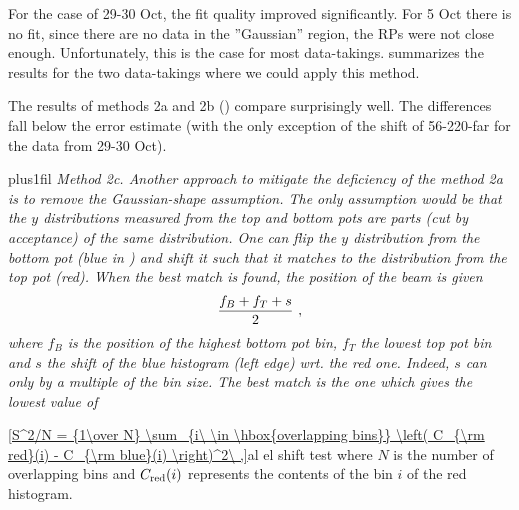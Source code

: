 For the case of 29-30 Oct, the fit quality improved significantly. For 5 Oct there is no fit, since there are no data in the ''Gaussian'' region, the RPs were not close enough. Unfortunately, this is the case for most data-takings.  summarizes the results for the two data-takings where we could apply this method.

The results of methods 2a and 2b () compare surprisingly well. The differences fall below the error estimate (with the only exception of the shift of 56-220-far for the data from 29-30 Oct).



\bmfig
\vbox{\noindent{} plus1fil
\em{Method 2c}. Another approach to mitigate the deficiency of the method 2a is to remove the Gaussian-shape assumption. The only assumption would be that the $y$ distributions measured from the top and bottom pots are parts (cut by acceptance) of the same distribution. One can flip the $y$ distribution from the bottom pot (blue in ) and shift it such that it matches to the distribution from the top pot (red). When the best match is found, the position of the beam is given
$${f_B + f_T + s\over 2}\ ,$$
where $f_B$ is the position of the highest bottom pot bin, $f_T$ the lowest top pot bin and $s$ the shift of the blue histogram (left edge) wrt. the red one. Indeed, $s$ can only by a multiple of the bin size. The best match is the one which gives the lowest value of
}%
%
\emfig

\eqref{S^2/N = {1\over N} \sum_{i\ \in \hbox{overlapping bins}} \left( C_{\rm red}(i) - C_{\rm blue}(i) \right)^2\ ,}{al el shift test}
where $N$ is the number of overlapping bins and $C_{\rm red}(i)$ represents the contents of the bin $i$ of the red histogram.


